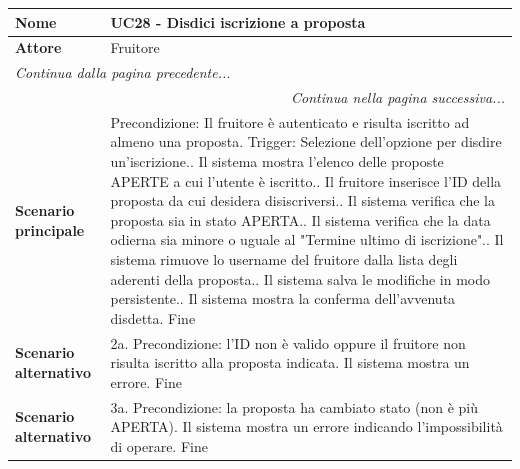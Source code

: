 \documentclass[12pt, a4paper, oneside]{report}
\begin{document}
\begin{tabularx}{\textwidth}{|l|X|}
    \hline
    \textbf{Nome}               & \textbf{UC28 - Disdici iscrizione a proposta} \\ \hline
    \textbf{Attore}             & Fruitore \\ \hline
    \endfirsthead 

    \hline
    \multicolumn{2}{|l|}{\textit{Continua dalla pagina precedente...}} \\ \hline
    \endhead 

    \hline
    \multicolumn{2}{|r|}{\textit{Continua nella pagina successiva...}} \\ \hline
    \endfoot 

    \hline
    \endlastfoot

    \textbf{Scenario principale} & 
    Precondizione: Il fruitore è autenticato e risulta iscritto ad almeno una proposta.\newline
    Trigger: Selezione dell'opzione per disdire un'iscrizione.\newline
    1. Il sistema mostra l'elenco delle proposte APERTE a cui l'utente è iscritto.\newline
    2. Il fruitore inserisce l'ID della proposta da cui desidera disiscriversi.\newline
    3. Il sistema verifica che la proposta sia in stato APERTA.\newline
    4. Il sistema verifica che la data odierna sia minore o uguale al "Termine ultimo di iscrizione".\newline
    5. Il sistema rimuove lo username del fruitore dalla lista degli aderenti della proposta.\newline
    6. Il sistema salva le modifiche in modo persistente.\newline
    7. Il sistema mostra la conferma dell'avvenuta disdetta. \newline
    Fine \\ \hline
    
    \textbf{Scenario alternativo} & 
    2a. Precondizione: l'ID non è valido oppure il fruitore non risulta iscritto alla proposta indicata.\newline
    Il sistema mostra un errore. \newline
    Fine \\ \hline

    \textbf{Scenario alternativo} & 
    3a. Precondizione: la proposta ha cambiato stato (non è più APERTA).\newline
    Il sistema mostra un errore indicando l'impossibilità di operare. \newline
    Fine \\ \hline


\end{tabularx}
\end{document}
